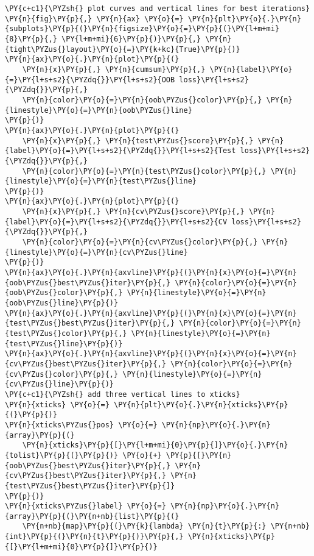 \begin{Verbatim}[commandchars=\\\{\}]
\PY{c+c1}{\PYZsh{} plot curves and vertical lines for best iterations}
\PY{n}{fig}\PY{p}{,} \PY{n}{ax} \PY{o}{=} \PY{n}{plt}\PY{o}{.}\PY{n}{subplots}\PY{p}{(}\PY{n}{figsize}\PY{o}{=}\PY{p}{(}\PY{l+m+mi}{8}\PY{p}{,} \PY{l+m+mi}{6}\PY{p}{)}\PY{p}{,} \PY{n}{tight\PYZus{}layout}\PY{o}{=}\PY{k+kc}{True}\PY{p}{)}
\PY{n}{ax}\PY{o}{.}\PY{n}{plot}\PY{p}{(}
    \PY{n}{x}\PY{p}{,} \PY{n}{cumsum}\PY{p}{,} \PY{n}{label}\PY{o}{=}\PY{l+s+s2}{\PYZdq{}}\PY{l+s+s2}{OOB loss}\PY{l+s+s2}{\PYZdq{}}\PY{p}{,} 
    \PY{n}{color}\PY{o}{=}\PY{n}{oob\PYZus{}color}\PY{p}{,} \PY{n}{linestyle}\PY{o}{=}\PY{n}{oob\PYZus{}line}
\PY{p}{)}
\PY{n}{ax}\PY{o}{.}\PY{n}{plot}\PY{p}{(}
    \PY{n}{x}\PY{p}{,} \PY{n}{test\PYZus{}score}\PY{p}{,} \PY{n}{label}\PY{o}{=}\PY{l+s+s2}{\PYZdq{}}\PY{l+s+s2}{Test loss}\PY{l+s+s2}{\PYZdq{}}\PY{p}{,} 
    \PY{n}{color}\PY{o}{=}\PY{n}{test\PYZus{}color}\PY{p}{,} \PY{n}{linestyle}\PY{o}{=}\PY{n}{test\PYZus{}line}
\PY{p}{)}
\PY{n}{ax}\PY{o}{.}\PY{n}{plot}\PY{p}{(}
    \PY{n}{x}\PY{p}{,} \PY{n}{cv\PYZus{}score}\PY{p}{,} \PY{n}{label}\PY{o}{=}\PY{l+s+s2}{\PYZdq{}}\PY{l+s+s2}{CV loss}\PY{l+s+s2}{\PYZdq{}}\PY{p}{,} 
    \PY{n}{color}\PY{o}{=}\PY{n}{cv\PYZus{}color}\PY{p}{,} \PY{n}{linestyle}\PY{o}{=}\PY{n}{cv\PYZus{}line}
\PY{p}{)}
\PY{n}{ax}\PY{o}{.}\PY{n}{axvline}\PY{p}{(}\PY{n}{x}\PY{o}{=}\PY{n}{oob\PYZus{}best\PYZus{}iter}\PY{p}{,} \PY{n}{color}\PY{o}{=}\PY{n}{oob\PYZus{}color}\PY{p}{,} \PY{n}{linestyle}\PY{o}{=}\PY{n}{oob\PYZus{}line}\PY{p}{)}
\PY{n}{ax}\PY{o}{.}\PY{n}{axvline}\PY{p}{(}\PY{n}{x}\PY{o}{=}\PY{n}{test\PYZus{}best\PYZus{}iter}\PY{p}{,} \PY{n}{color}\PY{o}{=}\PY{n}{test\PYZus{}color}\PY{p}{,} \PY{n}{linestyle}\PY{o}{=}\PY{n}{test\PYZus{}line}\PY{p}{)}
\PY{n}{ax}\PY{o}{.}\PY{n}{axvline}\PY{p}{(}\PY{n}{x}\PY{o}{=}\PY{n}{cv\PYZus{}best\PYZus{}iter}\PY{p}{,} \PY{n}{color}\PY{o}{=}\PY{n}{cv\PYZus{}color}\PY{p}{,} \PY{n}{linestyle}\PY{o}{=}\PY{n}{cv\PYZus{}line}\PY{p}{)}
\PY{c+c1}{\PYZsh{} add three vertical lines to xticks}
\PY{n}{xticks} \PY{o}{=} \PY{n}{plt}\PY{o}{.}\PY{n}{xticks}\PY{p}{(}\PY{p}{)}
\PY{n}{xticks\PYZus{}pos} \PY{o}{=} \PY{n}{np}\PY{o}{.}\PY{n}{array}\PY{p}{(}
    \PY{n}{xticks}\PY{p}{[}\PY{l+m+mi}{0}\PY{p}{]}\PY{o}{.}\PY{n}{tolist}\PY{p}{(}\PY{p}{)} \PY{o}{+} \PY{p}{[}\PY{n}{oob\PYZus{}best\PYZus{}iter}\PY{p}{,} \PY{n}{cv\PYZus{}best\PYZus{}iter}\PY{p}{,} \PY{n}{test\PYZus{}best\PYZus{}iter}\PY{p}{]}
\PY{p}{)}
\PY{n}{xticks\PYZus{}label} \PY{o}{=} \PY{n}{np}\PY{o}{.}\PY{n}{array}\PY{p}{(}\PY{n+nb}{list}\PY{p}{(}
    \PY{n+nb}{map}\PY{p}{(}\PY{k}{lambda} \PY{n}{t}\PY{p}{:} \PY{n+nb}{int}\PY{p}{(}\PY{n}{t}\PY{p}{)}\PY{p}{,} \PY{n}{xticks}\PY{p}{[}\PY{l+m+mi}{0}\PY{p}{]}\PY{p}{)}

\end{Verbatim}
